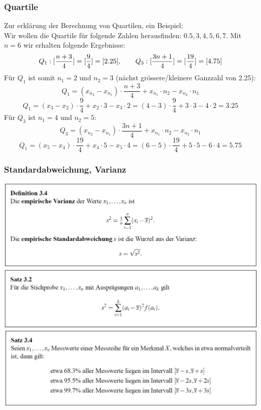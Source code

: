 \documentclass[12pt,a4paper]{article} %
\newcommand{\tab}{\hspace*{2em}} %
\begin{document}
\subsubsection{Quartile}
Zur erklärung der Berechnung von Quartilen, ein Beispiel:\\
Wir wollen die Quartile für folgende Zahlen herausfinden: $0.5, 3, 4, 5, 6, 7$. Mit $n=6$ wir erhalten folgende Ergebnisse:
$$Q_1:[\frac{n+3}{4}] = [\frac{9}{4}] = [2.25],\tab Q_3:[\frac{3n+1}{4}] = [\frac{19}{4}] = [4.75]$$
Für $Q_1$ ist somit $n_1 = 2$ und $n_2 = 3$ (nächst grössere/kleinere Ganzzahl von 2.25):
$$Q_1 = (x_{n_2} - x_{n_1})\cdot \frac{n+3}{4} + x_{n_1} \cdot n_2 - x_{n_2} \cdot n_1$$
$$Q_1 = (x_3 - x_2) \cdot \frac{9}{4} + x_2 \cdot 3 - x_3 \cdot 2 = (4-3) \cdot \frac{9}{4} + 3 \cdot 3 - 4 \cdot 2 = 3.25$$
Für $Q_3$ ist $n_1 = 4$ und $n_2 = 5$:
$$Q_3 = (x_{n_2} - x_{n_1})\cdot \frac{3n+1}{4} + x_{n_1} \cdot n_2 - x_{n_2} \cdot n_1$$
$$Q_1 = (x_5 - x_4) \cdot \frac{19}{4} + x_4 \cdot 5 - x_5 \cdot 4 = (6-5) \cdot \frac{19}{4} + 5 \cdot 5 - 6 \cdot 4 = 5.75$$

\subsubsection{Standardabweichung, Varianz}


\begin{center}
\includegraphics[scale=0.5]{defVarianz.jpg}
\includegraphics[scale=0.5]{defVarianz2.jpg}
\includegraphics[scale=0.5]{bedStandardabweichung.jpg}
\end{center}
\end{document}
